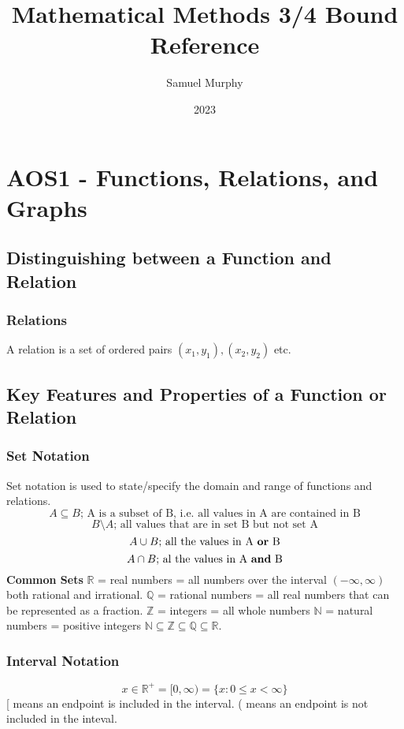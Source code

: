 \documentclass{article}
\title {Mathematical Methods 3/4 Bound Reference}
\author {Samuel Murphy}
\date{2023}
\begin{document}
	\maketitle
	\newpage
	\tableofcontents
	\newpage
	\section{AOS1 - Functions, Relations, and Graphs}
		\subsection{Distinguishing between a Function and Relation}
			\subsubsection{Relations}
				A relation is a set of ordered pairs $(x_1,y_1), (x_2,y_2)$ etc.\newline
				
		\subsection{Key Features and Properties of a Function or Relation}
			\subsubsection{Set Notation}
				Set notation is used to state/specify the domain and range of functions and relations.\newline
				\[A\subseteq B\text{; A is a subset of B, i.e. all values in A are contained in B} \]
				\[B\setminus A\text{; all values that are in set B but not set A}\]
				\[A \cup B\text{; all the values in A \textbf{or} B}\]
				\[A \cap B\text{; al the values in A \textbf{and} B}\]
				\textbf{Common Sets}\newline
				$\mathbb{R}$ = real numbers = all numbers over the interval $(-\infty,\infty)$ both rational and irrational.\newline
				$\mathbb{Q}$ = rational numbers = all real numbers that can be represented as a fraction. \newline
				$\mathbb{Z}$ = integers = all whole numbers \newline
				$\mathbb{N}$ = natural numbers = positive integers \newline
				$\mathbb{N}\subseteq\mathbb{Z}\subseteq\mathbb{Q}\subseteq\mathbb{R}$.
			\subsubsection{Interval Notation}
				\[x\in\mathbb{R}^+ = [0,\infty) = \{x:0\le x<\infty\}\]
				[ means an endpoint is included in the interval.\newline
				( means an endpoint is not included in the inteval.\newline
\end{document}
